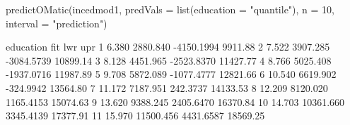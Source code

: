 \begin{Schunk}
\begin{Sinput}
 predictOMatic(incedmod1, predVals = list(education = "quantile"), n = 10, interval = "prediction")
\end{Sinput}
\begin{Soutput}
   education       fit        lwr      upr
1      6.380  2880.840 -4150.1994  9911.88
2      7.522  3907.285 -3084.5739 10899.14
3      8.128  4451.965 -2523.8370 11427.77
4      8.766  5025.408 -1937.0716 11987.89
5      9.708  5872.089 -1077.4777 12821.66
6     10.540  6619.902  -324.9942 13564.80
7     11.172  7187.951   242.3737 14133.53
8     12.209  8120.020  1165.4153 15074.63
9     13.620  9388.245  2405.6470 16370.84
10    14.703 10361.660  3345.4139 17377.91
11    15.970 11500.456  4431.6587 18569.25
\end{Soutput}
\end{Schunk}
